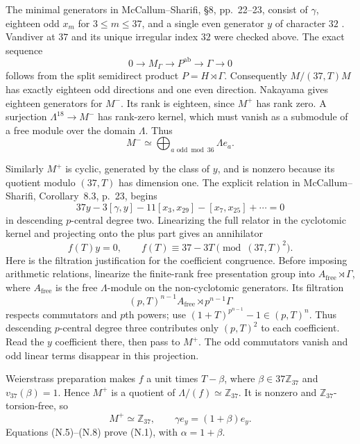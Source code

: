 \documentclass[11pt,a4paper]{article}
\theoremstyle{definition}
\begin{document}
The minimal generators in McCallum--Sharifi, \S8, pp.~22--23, consist of $\gamma$, eighteen odd $x_m$ for $3\le m\le37$, and a single even generator $y$ of character $32$ \cite{McCallumSharifi2003}. Vandiver at $37$ and its unique irregular index $32$ were checked above. The exact sequence
\[
 0\longrightarrow M_{\Gamma}\longrightarrow P^{\mathrm{ab}}
   \longrightarrow\Gamma\longrightarrow0
\]
follows from the split semidirect product $P=H\rtimes\Gamma$. Consequently $M/(37,T)M$ has exactly eighteen odd directions and one even direction. Nakayama gives eighteen generators for $M^-$. Its rank is eighteen, since $M^+$ has rank zero. A surjection $\Lambda^{18}\to M^-$ has rank-zero kernel, which must vanish as a submodule of a free module over the domain $\Lambda$. Thus
\[
 M^-\simeq\bigoplus_{a\text{ odd}\bmod36}\Lambda e_a.           \tag{N.5}
\]

Similarly $M^+$ is cyclic, generated by the class of $y$, and is nonzero because its quotient modulo $(37,T)$ has dimension one. The explicit relation in McCallum--Sharifi, Corollary~8.3, p.~23, begins
\[
 37y-3[\gamma,y]-11[x_3,x_{29}]-[x_7,x_{25}]+\cdots=0
                                                                  \tag{N.6}
\]
in descending $p$-central degree two. Linearizing the full relator in the cyclotomic kernel and projecting onto the plus part gives an annihilator
\[
 f(T)y=0,\qquad f(T)\equiv37-3T\pmod{(37,T)^2}.                \tag{N.7}
\]
Here is the filtration justification for the coefficient congruence. Before imposing arithmetic relations, linearize the finite-rank free presentation group into $A_{\mathrm{free}}\rtimes\Gamma$, where $A_{\mathrm{free}}$ is the free $\Lambda$-module on the non-cyclotomic generators. Its filtration
\[
 (p,T)^{n-1}A_{\mathrm{free}}\rtimes p^{n-1}\Gamma
\]
respects commutators and $p$th powers; use
$(1+T)^{p^{n-1}}-1\in(p,T)^n$. Thus descending $p$-central degree three contributes only $(p,T)^2$ to each coefficient. Read the $y$ coefficient there, then pass to $M^+$. The odd commutators vanish and odd linear terms disappear in this projection.

Weierstrass preparation makes $f$ a unit times $T-\beta$, where $\beta\in37\mathbb Z_{37}$ and $v_{37}(\beta)=1$. Hence $M^+$ is a quotient of $\Lambda/(f)\simeq\mathbb Z_{37}$. It is nonzero and $\mathbb Z_{37}$-torsion-free, so
\[
 M^+\simeq\mathbb Z_{37},\qquad\gamma e_y=(1+\beta)e_y.        \tag{N.8}
\]
Equations (N.5)--(N.8) prove (N.1), with $\alpha=1+\beta$.
\end{document}
